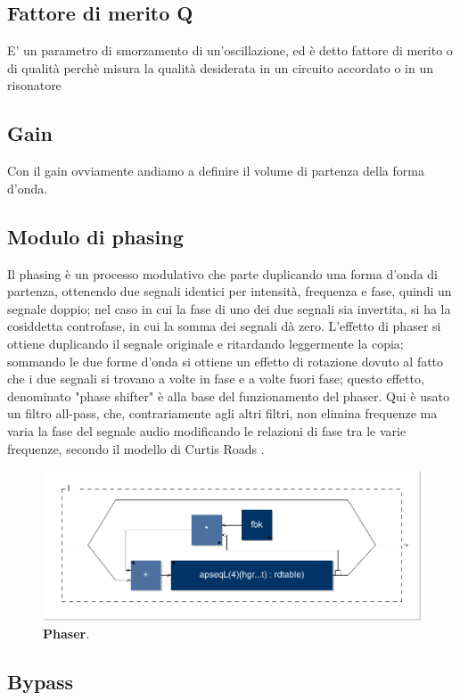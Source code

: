\documentclass[
	a4paper,
	twocolumn
	]{article}
\begin{document}
\subsection*{Fattore di merito Q}

E' un parametro di smorzamento di un'oscillazione, ed è detto fattore di merito o
di qualità perchè misura la qualità desiderata in un circuito accordato o in un
risonatore

\subsection*{Gain}

Con il gain ovviamente andiamo a definire il volume di partenza della forma
d’onda.

\subsection*{Modulo di phasing}

Il phasing è un processo modulativo che parte duplicando una forma d'onda di
partenza, ottenendo due segnali identici per intensità, frequenza e fase,
quindi un segnale doppio; nel caso in cui la fase di uno dei due segnali sia
invertita, si ha la cosiddetta controfase, in cui la somma dei segnali dà zero.
L'effetto di phaser si ottiene duplicando il segnale originale e ritardando
leggermente la copia; sommando le due forme d'onda si ottiene un effetto di
rotazione dovuto al fatto che i due segnali si trovano a volte in fase e a
volte fuori fase; questo effetto, denominato "phase shifter" è alla base del
funzionamento del phaser. Qui è usato un filtro all-pass, che, contrariamente
agli altri filtri, non elimina frequenze ma varia la fase del segnale audio
modificando le relazioni di fase tra le varie frequenze, secondo il modello di
Curtis Roads \cite{cr1996cmt}.

\begin{figure}[h]
\begin{center}
\includegraphics[width=.47\textwidth]{img/phaser.pdf}
\caption{\textbf{Phaser}.}
\label{phas}
\end{center}
\end{figure}

\subsection*{Bypass}
\end{document}
